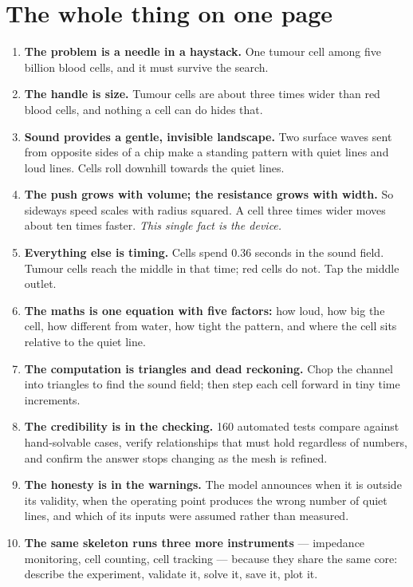 \documentclass[11pt,a4paper]{article}
\begin{document}
\section{The whole thing on one page}

\begin{enumerate}[leftmargin=*,itemsep=6pt]
\item \textbf{The problem is a needle in a haystack.} One tumour cell among five
billion blood cells, and it must survive the search.

\item \textbf{The handle is size.} Tumour cells are about three times wider than
red blood cells, and nothing a cell can do hides that.

\item \textbf{Sound provides a gentle, invisible landscape.} Two surface waves
sent from opposite sides of a chip make a standing pattern with quiet lines and
loud lines. Cells roll downhill towards the quiet lines.

\item \textbf{The push grows with volume; the resistance grows with width.} So
sideways speed scales with radius squared. A cell three times wider moves about
ten times faster. \emph{This single fact is the device.}

\item \textbf{Everything else is timing.} Cells spend 0.36 seconds in the sound
field. Tumour cells reach the middle in that time; red cells do not. Tap the
middle outlet.

\item \textbf{The maths is one equation with five factors:} how loud, how big
the cell, how different from water, how tight the pattern, and where the cell
sits relative to the quiet line.

\item \textbf{The computation is triangles and dead reckoning.} Chop the
channel into triangles to find the sound field; then step each cell forward in
tiny time increments.

\item \textbf{The credibility is in the checking.} 160 automated tests compare
against hand-solvable cases, verify relationships that must hold regardless of
numbers, and confirm the answer stops changing as the mesh is refined.

\item \textbf{The honesty is in the warnings.} The model announces when it is
outside its validity, when the operating point produces the wrong number of
quiet lines, and which of its inputs were assumed rather than measured.

\item \textbf{The same skeleton runs three more instruments} --- impedance
monitoring, cell counting, cell tracking --- because they share the same core:
describe the experiment, validate it, solve it, save it, plot it.
\end{enumerate}
\end{document}
